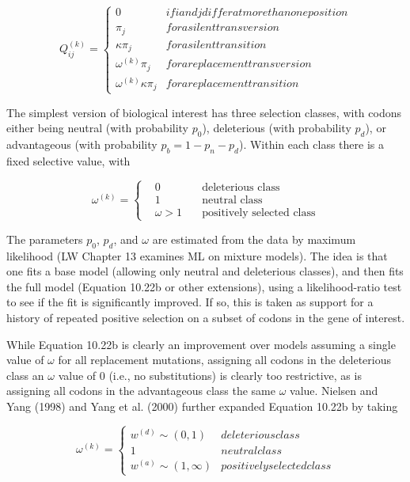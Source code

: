 \documentclass{article}
\begin{document}
\begin{equation}
Q_{ij}^{(k)}=\begin{cases}0&if i and j differ at more than one position\\\pi_{j}&for a silent transversion\\\kappa\pi_{j}&for a silent transition\\\omega^{(k)}\pi_{j}&for a replacement transversion\\\omega^{(k)}\kappa\pi_{j}&for a replacement transition\end{cases}
\tag{10.22a}
\label{eq:10_22a}
\end{equation}

The simplest version of biological interest has three selection classes, with codons either being neutral (with probability  $ p_0 $), deleterious (with probability  $ p_d $), or advantageous (with probability  $ p_b = 1 - p_n - p_d $). Within each class there is a fixed selective value, with

\begin{equation}
\omega^{(k)}=\left\{\begin{aligned}&0&\quad\text{deleterious class}\\ &1&\quad\text{neutral class}\\ &\omega>1&\quad\text{positively selected class}\end{aligned}\right.
\tag{10.22b}
\label{eq:10_22b}
\end{equation}

The parameters  $ p_{0} $,  $ p_{d} $, and  $ \omega $ are estimated from the data by maximum likelihood (LW Chapter 13 examines ML on mixture models). The idea is that one fits a base model (allowing only neutral and deleterious classes), and then fits the full model (Equation 10.22b or other extensions), using a likelihood-ratio test to see if the fit is significantly improved. If so, this is taken as support for a history of repeated positive selection on a subset of codons in the gene of interest.

While Equation 10.22b is clearly an improvement over models assuming a single value of  $ \omega $ for all replacement mutations, assigning all codons in the deleterious class an  $ \omega $ value of 0 (i.e., no substitutions) is clearly too restrictive, as is assigning all codons in the advantageous class the same  $ \omega $ value. Nielsen and Yang (1998) and Yang et al. (2000) further expanded Equation 10.22b by taking

\begin{equation}
\omega^{(k)}=\left\{\begin{array}{ll}w^{(d)}\sim(0,1)&deleterious class\\1&neutral class\\w^{(a)}\sim(1,\infty)&positively selected class\end{array}\right.
\tag{10.23}
\label{eq:10_23}
\end{equation}
\end{document}
